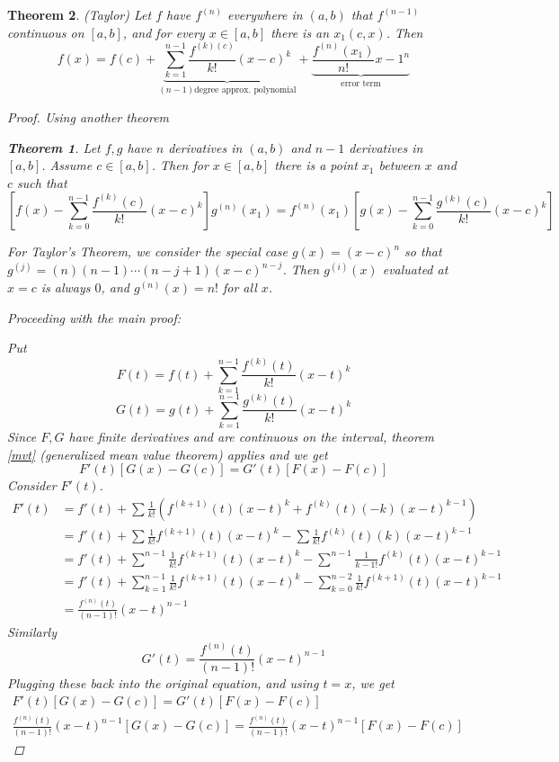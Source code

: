 \documentclass[12pt]{article}
\newtheorem{theorem}{Theorem}[section]
\theoremstyle{definition}
\theoremstyle{remark}
\begin{document}
\begin{theorem}
    (Taylor) Let $f$ have $f^{(n)}$ everywhere in $(a,b)$ that $f^{(n-1)}$ continuous on $[a,b]$, and for every $x\in[a,b]$ there is an $x_1(c,x)$. Then
    \begin{equation}
        f(x)=f(c)+\underbrace{\sum_{k=1}^{n-1}\frac{f^{(k)(c)}}{k!}(x-c)^k}_{(n-1) \text{degree approx. polynomial}}+\underbrace{\frac{f^{(n)}(x_1)}{n!}x-1^n}_{\text{error term}}
    \end{equation}
    \begin{proof}
        Using another theorem \begin{theorem}
            Let $f,g$ have $n$ derivatives in $(a,b)$ and $n-1$ derivatives in $[a,b]$. Assume $c\in[a,b]$. Then for $x\in[a,b]$ there is a point $x_1$ between $x$ and $c$ such that
            \[
            \left[f(x)-\sum^{n-1}_{k=0}\frac{f^{(k)}(c)}{k!}(x-c)^k\right]g^{(n)}(x_1)=f^{(n)}(x_1)\left[g(x)-\sum^{n-1}_{k=0}\frac{g^{(k)}(c)}{k!}(x-c)^k\right]
            \]
        \end{theorem}
        For Taylor's Theorem, we consider the special case $g(x)=(x-c)^n$ so that $g^{(j)}=(n)(n-1)\cdots(n-j+1)(x-c)^{n-j}$. Then $g^{(i)}(x)$ evaluated at $x=c$ is always $0$, and $g^{(n)}(x)=n!$ for all $x$.

        Proceeding with the main proof:

        Put 
        \[F(t)=f(t)+\sum_{k=1}^{n-1}\frac{f^{(k)}(t)}{k!}(x-t)^k\]
        \[G(t)=g(t)+\sum_{k=1}^{n-1}\frac{g^{(k)}(t)}{k!}(x-t)^k\]
        Since $F,G$ have finite derivatives and are continuous on the interval, theorem \ref{mvt} (generalized mean value theorem) applies and we get
        \[ F'(t)[G(x)-G(c)]=G'(t)[F(x)-F(c)] \]
        Consider $F'(t)$.
        \begin{align*}
            F'(t)&=f'(t)+\sum \frac{1}{k!}\left(f^{(k+1)}(t)(x-t)^k+f^{(k)}(t)(-k)(x-t)^{k-1}\right)\tag{By chain and product rule}\\
            &=f'(t)+\sum \frac{1}{k!}f^{(k+1)}(t)(x-t)^k-\sum\frac{1}{k!} f^{(k)}(t)(k)(x-t)^{k-1}\\
            &=f'(t)+\sum^{n-1} \frac{1}{k!}f^{(k+1)}(t)(x-t)^k-\sum^{n-1}\frac{1}{k-1!} f^{(k)}(t)(x-t)^{k-1}\\
            &=f'(t)+\sum^{n-1}_{k=1} \frac{1}{k!}f^{(k+1)}(t)(x-t)^k-\sum^{n-2}_{k=0}\frac{1}{k!} f^{(k+1)}(t)(x-t)^{k-1}\\
            &=\frac{f^{(n)}(t)}{(n-1)!}(x-t)^{n-1}
        \end{align*}
        Similarly
        \[G'(t)=\frac{f^{(n)}(t)}{(n-1)!}(x-t)^{n-1}\]
        Plugging these back into the original equation, and using $t=x$, we get
        \begin{align*}
            F'(t)[G(x)-G(c)]=G'(t)[F(x)-F(c)]\\
            \frac{f^{(n)}(t)}{(n-1)!}(x-t)^{n-1}[G(x)-G(c)]=\frac{f^{(n)}(t)}{(n-1)!}(x-t)^{n-1}[F(x)-F(c)]
        \end{align*}
    \end{proof}
\end{theorem}
\end{document}
